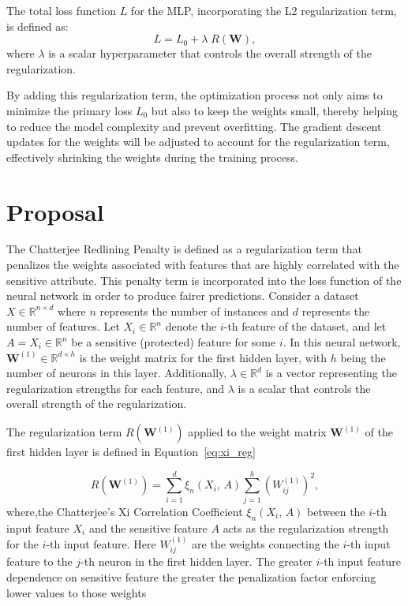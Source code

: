 The total loss function $L$ for the MLP, incorporating the L2 regularization term, is defined as:
\begin{equation}
L = L_0 + \lambda \; R(\mathbf{W}),
\end{equation}
where $\lambda$ is a scalar hyperparameter that controls the overall strength of the regularization.

By adding this regularization term, the optimization process not only aims to minimize the primary loss $L_0$ but also to keep the weights small, thereby helping to reduce the model complexity and prevent overfitting. The gradient descent updates for the weights will be adjusted to account for the regularization term, effectively shrinking the weights during the training process.


\section{Proposal}

The Chatterjee Redlining Penalty is defined as a regularization term that penalizes the weights associated with features that are highly correlated with the sensitive attribute. This penalty term is incorporated into the loss function of the neural network in order to produce fairer predictions. Consider a dataset \(X \in \mathbb{R}^{n \times d}\) where \(n\) represents the number of instances and \(d\) represents the number of features. Let \(X_i \in \mathbb{R}^n\) denote the \(i\)-th feature of the dataset, and let \(A = X_i \in \mathbb{R}^n\) be a sensitive (protected) feature for some \(i\). In this neural network, \(\mathbf{W}^{(1)} \in \mathbb{R}^{d \times h}\) is the weight matrix for the first hidden layer, with \(h\) being the number of neurons in this layer. Additionally, \(\lambda \in \mathbb{R}^d\) is a vector representing the regularization strengths for each feature, and $\lambda$ is a scalar that controls the overall strength of the regularization.

The regularization term \(R(\mathbf{W}^{(1)})\) applied to the weight matrix \(\mathbf{W}^{(1)}\) of the first hidden layer is defined in Equation~\ref{eq:xi_reg}

\begin{equation}\label{eq:xi_reg}
R(\mathbf{W}^{(1)}) = \sum_{i=1}^d \xi_n(X_i,\,A) \sum_{j=1}^h (W^{(1)}_{ij})^2,
\end{equation}
where,the Chatterjee's Xi Correlation Coefficient  $\xi_n(X_i,\,A)$  between the $i$-th input feature $X_i$ and the sensitive feature $A$ acts as the regularization strength for the $i$-th input feature. Here $W^{(1)}_{ij}$ are the weights connecting the $i$-th input feature to the $j$-th neuron in the first hidden layer. The greater $i$-th input feature dependence on sensitive feature the greater the penalization factor enforcing lower values to those weights

